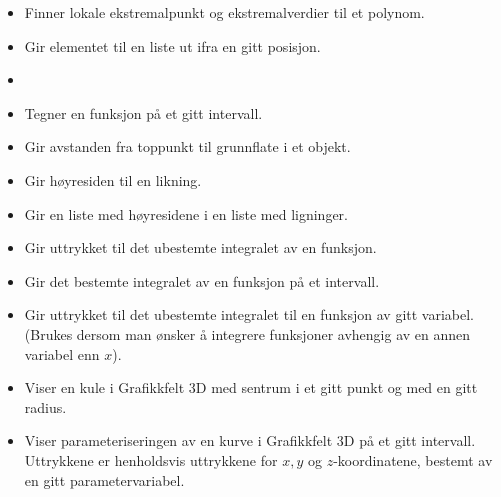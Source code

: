 \begin{itemize}
\item {}
{Finner lokale ekstremalpunkt og ekstremalverdier til et polynom.}

\item {}
{
Gir elementet til en liste ut ifra en gitt posisjon.
}

\item {}

\item {}
{Tegner en funksjon på et gitt intervall.}

\newpage
\item {}
{Gir avstanden fra toppunkt til grunnflate i et objekt.\\ 
	}

\item {}
{Gir høyresiden til en likning.}

\item {}
{Gir en liste med høyresidene i en liste med ligninger.}

\item {}
{Gir uttrykket til det ubestemte integralet av en funksjon. \\
}

\item {}
{Gir det bestemte integralet av en funksjon på et intervall.}

\item {}
{Gir uttrykket til det ubestemte integralet til en funksjon av gitt variabel. (Brukes dersom man ønsker å integrere funksjoner avhengig av en annen variabel enn $ x $).}

\item {}
{Viser en kule i Grafikkfelt 3D med sentrum i et gitt punkt og med en gitt radius.}

\item {}
{Viser parameteriseringen av en kurve i Grafikkfelt 3D på et gitt intervall. Uttrykkene er henholdsvis uttrykkene for $ {x, y} $ og $ z $-koordinatene, bestemt av en gitt parametervariabel. \\
}	


\end{itemize}
